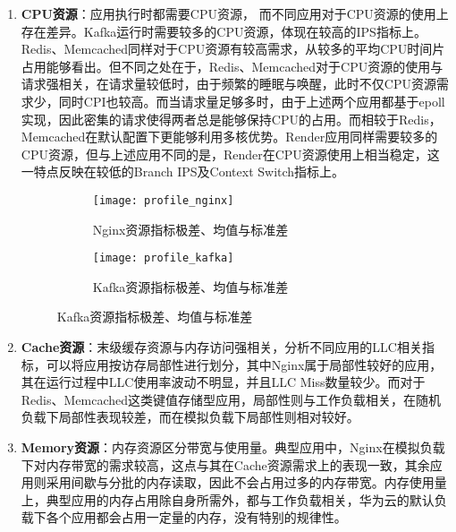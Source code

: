 \begin{enumerate}

    \item \textbf{CPU资源}：应用执行时都需要CPU资源， 而不同应用对于CPU资源的使用上存在差异。Kafka运行时需要较多的CPU资源，体现在较高的IPS指标上。Redis、Memcached同样对于CPU资源有较高需求，从较多的平均CPU时间片占用能够看出。但不同之处在于，Redis、Memcached对于CPU资源的使用与请求强相关，在请求量较低时，由于频繁的睡眠与唤醒，此时不仅CPU资源需求少，同时CPI也较高。而当请求量足够多时，由于上述两个应用都基于epoll实现，因此密集的请求使得两者总是能够保持CPU的占用。而相较于Redis，Memcached在默认配置下更能够利用多核优势。Render应用同样需要较多的CPU资源，但与上述应用不同的是，Render在CPU资源使用上相当稳定，这一特点反映在较低的Branch IPS及Context Switch指标上。

\begin{figure}[H]
    \centering
    \begin{subfigure}[b]{0.85\textwidth}
      \texttt{[image: profile\_nginx]}
      \caption{Nginx资源指标极差、均值与标准差}
      \label{fig:profile_nginx}
    \end{subfigure}
    \begin{subfigure}[b]{0.85\textwidth}
        \texttt{[image: profile\_kafka]}
        \caption{Kafka资源指标极差、均值与标准差}
        \label{fig:profile_kafka}
    \end{subfigure}
\label{fig:resource_affinity_1}
\end{figure}

    \item \textbf{Cache资源}：末级缓存资源与内存访问强相关，分析不同应用的LLC相关指标，可以将应用按访存局部性进行划分，其中Nginx属于局部性较好的应用，其在运行过程中LLC使用率波动不明显，并且LLC Miss数量较少。而对于Redis、Memcached这类键值存储型应用，局部性则与工作负载相关，在随机负载下局部性表现较差，而在模拟负载下局部性则相对较好。
    
    \item \textbf{Memory资源}：内存资源区分带宽与使用量。典型应用中，Nginx在模拟负载下对内存带宽的需求较高，这点与其在Cache资源需求上的表现一致，其余应用则采用间歇与分批的内存读取，因此不会占用过多的内存带宽。内存使用量上，典型应用的内存占用除自身所需外，都与工作负载相关，华为云的默认负载下各个应用都会占用一定量的内存，没有特别的规律性。
    

\end{enumerate}

